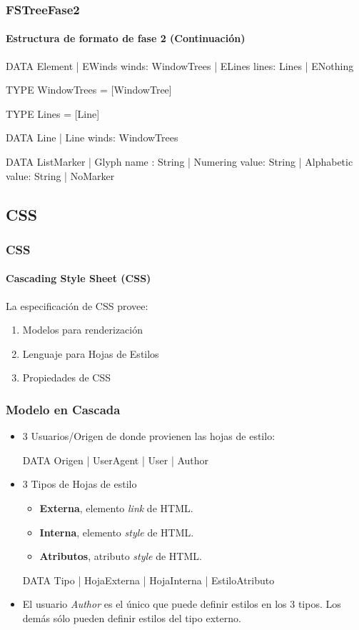 \documentclass[12pt]{beamer}
\begin{document}
\begin{frame}[fragile]
\frametitle{FSTreeFase2}
\framesubtitle{Estructura de formato de fase 2 (Continuación)}
\begin{block}{}
\begin{ag}
DATA Element
  | EWinds winds: WindowTrees
  | ELines lines: Lines
  | ENothing

TYPE WindowTrees = [WindowTree]

TYPE Lines       = [Line]

DATA Line
  | Line winds: WindowTrees

DATA ListMarker
  | Glyph      name : String
  | Numering   value: String
  | Alphabetic value: String
  | NoMarker
\end{ag}
\end{block}
\end{frame}

\subsection{CSS}
\begin{frame}
\frametitle{CSS}
\framesubtitle{Cascading Style Sheet (CSS)}
La especificación de CSS provee:
\begin{enumerate}
	\item Modelos para renderización
	\item Lenguaje para Hojas de Estilos
	\item Propiedades de CSS
\end{enumerate}
\end{frame}

\begin{frame}[fragile]
\frametitle{Modelo en Cascada}
\begin{itemize}
\item 3 Usuarios/Origen de donde provienen las hojas de estilo:
\begin{block}{}
\begin{ag}
DATA Origen
  | UserAgent | User | Author

\end{ag}
\end{block}

\item 3 Tipos de Hojas de estilo
\begin{itemize}
	\item \textbf{Externa}, elemento \textit{link} de HTML.
	\item \textbf{Interna}, elemento \textit{style} de HTML.
	\item \textbf{Atributos}, atributo \textit{style} de HTML.
\end{itemize}
\begin{block}{}
\begin{ag}
DATA Tipo
  | HojaExterna | HojaInterna | EstiloAtributo

\end{ag}
\end{block}
\item El usuario \textit{Author} es el único que puede definir estilos
en los 3 tipos. Los demás sólo pueden definir estilos del tipo externo.
\end{itemize}
\end{frame}
\end{document}
